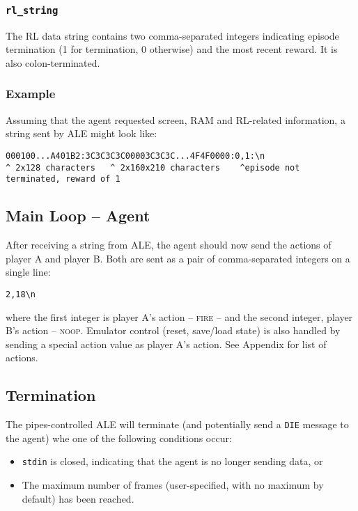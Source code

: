 \documentclass[12pt]{article}
\begin{document}
\subsubsection{\texttt{rl\_string}}

The RL data string contains two comma-separated integers indicating episode termination (1 for
termination, 0 otherwise) and the most recent reward. It is also colon-terminated.

\subsubsection{Example}

Assuming that the agent requested screen, RAM and RL-related information, a string sent by ALE might look like:

\begin{verbatim}
000100...A401B2:3C3C3C3C00003C3C3C...4F4F0000:0,1:\n
^ 2x128 characters   ^ 2x160x210 characters    ^episode not terminated, reward of 1
\end{verbatim}

\subsection{Main Loop -- Agent}

After receiving a string from ALE, the agent should now send the actions of player A and player B.
Both are sent as a pair of comma-separated integers on a single line:

\begin{verbatim}
2,18\n
\end{verbatim}

where the first integer is player A's action -- \textsc{fire} -- and the second integer, player B's action -- \textsc{noop}. Emulator control (reset, save/load state) is also handled by sending a special action value as player A's action. See Appendix for list of actions.

\subsection{Termination}\label{subsec:termination_conditions}

The pipes-controlled ALE will terminate (and potentially send a \verb+DIE+ message to the agent) whe one of the following conditions occur:

\begin{itemize}
  \item{\texttt{stdin} is closed, indicating that the agent is no longer sending data, or}
  \item{The maximum number of frames (user-specified, with no maximum by default) has been reached.}
\end{itemize}
\end{document}
